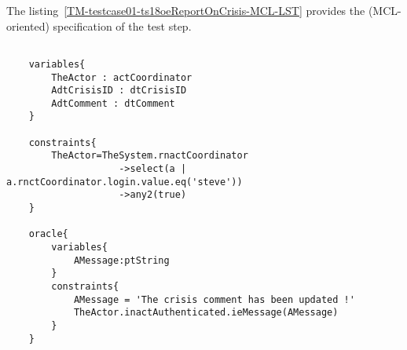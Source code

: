	
	
		
	\vspace{1cm}
	The listing~\ref{TM-testcase01-ts18oeReportOnCrisis-MCL-LST} provides the \msrmessir (MCL-oriented) specification of the test step.
	
	\scriptsize
	\vspace{0.5cm}
	\begin{lstlisting}[style=MessirStyle,firstnumber=auto,captionpos=b,caption={\msrmessir (MCL-oriented) specification of the test step \emph{testcase01-ts18oeReportOnCrisis}.},label=TM-testcase01-ts18oeReportOnCrisis-MCL-LST]

	variables{
		TheActor : actCoordinator
		AdtCrisisID : dtCrisisID
		AdtComment : dtComment
	}
	
	constraints{
		TheActor=TheSystem.rnactCoordinator
		            ->select(a | a.rnctCoordinator.login.value.eq('steve'))
		            ->any2(true)
	}
	
	oracle{
		variables{
			AMessage:ptString
		}
		constraints{
			AMessage = 'The crisis comment has been updated !'
			TheActor.inactAuthenticated.ieMessage(AMessage)
		}
	}
	
	\end{lstlisting}
	\normalsize 
	
	
